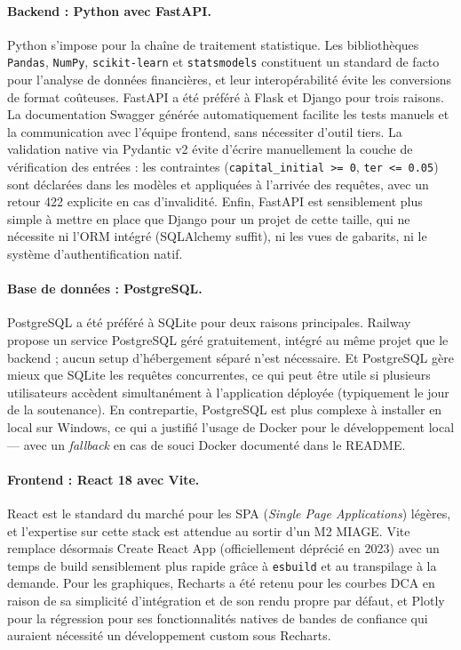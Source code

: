 \documentclass[11pt,a4paper]{article}
\begin{document}
\paragraph{Backend : Python avec FastAPI.}
Python s'impose pour la chaîne de traitement statistique. Les
bibliothèques \texttt{Pandas}, \texttt{NumPy}, \texttt{scikit-learn} et
\texttt{statsmodels} constituent un standard de facto pour l'analyse
de données financières, et leur interopérabilité évite les conversions
de format coûteuses. FastAPI a été préféré à Flask et Django pour trois
raisons. La documentation Swagger générée automatiquement facilite les
tests manuels et la communication avec l'équipe frontend, sans
nécessiter d'outil tiers. La validation native via Pydantic v2 évite
d'écrire manuellement la couche de vérification des entrées : les
contraintes (\texttt{capital\_initial >= 0}, \texttt{ter <= 0.05}) sont
déclarées dans les modèles et appliquées à l'arrivée des requêtes, avec
un retour 422 explicite en cas d'invalidité. Enfin, FastAPI est
sensiblement plus simple à mettre en place que Django pour un projet de
cette taille, qui ne nécessite ni l'ORM intégré (SQLAlchemy suffit), ni
les vues de gabarits, ni le système d'authentification natif.

\paragraph{Base de données : PostgreSQL.}
PostgreSQL a été préféré à SQLite pour deux raisons principales.
Railway propose un service PostgreSQL géré gratuitement, intégré au
même projet que le backend ; aucun setup d'hébergement séparé n'est
nécessaire. Et PostgreSQL gère mieux que SQLite les requêtes
concurrentes, ce qui peut être utile si plusieurs utilisateurs accèdent
simultanément à l'application déployée (typiquement le jour de la
soutenance). En contrepartie, PostgreSQL est plus complexe à installer
en local sur Windows, ce qui a justifié l'usage de Docker pour le
développement local — avec un \textit{fallback} en cas de souci Docker
documenté dans le README.

\paragraph{Frontend : React 18 avec Vite.}
React est le standard du marché pour les SPA (\textit{Single Page
Applications}) légères, et l'expertise sur cette stack est attendue au
sortir d'un M2 MIAGE. Vite remplace désormais Create React App
(officiellement déprécié en 2023) avec un temps de build sensiblement
plus rapide grâce à \texttt{esbuild} et au transpilage à la demande.
Pour les graphiques, Recharts a été retenu pour les courbes DCA en
raison de sa simplicité d'intégration et de son rendu propre par
défaut, et Plotly pour la régression pour ses fonctionnalités natives
de bandes de confiance qui auraient nécessité un développement custom
sous Recharts.
\end{document}
